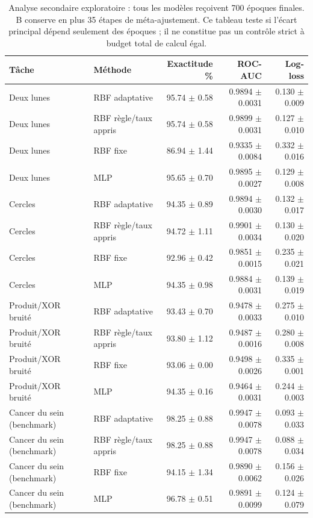 \documentclass[11pt,a4paper]{article}
\begin{document}
\begin{table}[htbp]
\centering
\small
\setlength{\tabcolsep}{4pt}
\renewcommand{\arraystretch}{1.08}
\begin{tabular}{llrrr}
\toprule
Tâche & Méthode & Exactitude \% & ROC-AUC & Log-loss \\
\midrule
Deux lunes & RBF adaptative & 95.74 $\pm$ 0.58 & 0.9894 $\pm$ 0.0031 & 0.130 $\pm$ 0.009 \\
Deux lunes & RBF règle/taux appris & 95.74 $\pm$ 0.58 & 0.9899 $\pm$ 0.0031 & 0.127 $\pm$ 0.010 \\
Deux lunes & RBF fixe & 86.94 $\pm$ 1.44 & 0.9335 $\pm$ 0.0084 & 0.332 $\pm$ 0.016 \\
Deux lunes & MLP & 95.65 $\pm$ 0.70 & 0.9895 $\pm$ 0.0027 & 0.129 $\pm$ 0.008 \\
Cercles & RBF adaptative & 94.35 $\pm$ 0.89 & 0.9894 $\pm$ 0.0030 & 0.132 $\pm$ 0.017 \\
Cercles & RBF règle/taux appris & 94.72 $\pm$ 1.11 & 0.9901 $\pm$ 0.0034 & 0.130 $\pm$ 0.020 \\
Cercles & RBF fixe & 92.96 $\pm$ 0.42 & 0.9851 $\pm$ 0.0015 & 0.235 $\pm$ 0.021 \\
Cercles & MLP & 94.35 $\pm$ 0.98 & 0.9884 $\pm$ 0.0031 & 0.139 $\pm$ 0.019 \\
Produit/XOR bruité & RBF adaptative & 93.43 $\pm$ 0.70 & 0.9478 $\pm$ 0.0033 & 0.275 $\pm$ 0.010 \\
Produit/XOR bruité & RBF règle/taux appris & 93.80 $\pm$ 1.12 & 0.9487 $\pm$ 0.0016 & 0.280 $\pm$ 0.008 \\
Produit/XOR bruité & RBF fixe & 93.06 $\pm$ 0.00 & 0.9498 $\pm$ 0.0026 & 0.335 $\pm$ 0.001 \\
Produit/XOR bruité & MLP & 94.35 $\pm$ 0.16 & 0.9464 $\pm$ 0.0031 & 0.244 $\pm$ 0.003 \\
Cancer du sein (benchmark) & RBF adaptative & 98.25 $\pm$ 0.88 & 0.9947 $\pm$ 0.0078 & 0.093 $\pm$ 0.033 \\
Cancer du sein (benchmark) & RBF règle/taux appris & 98.25 $\pm$ 0.88 & 0.9947 $\pm$ 0.0078 & 0.088 $\pm$ 0.034 \\
Cancer du sein (benchmark) & RBF fixe & 94.15 $\pm$ 1.34 & 0.9890 $\pm$ 0.0062 & 0.156 $\pm$ 0.026 \\
Cancer du sein (benchmark) & MLP & 96.78 $\pm$ 0.51 & 0.9891 $\pm$ 0.0099 & 0.124 $\pm$ 0.079 \\
\bottomrule
\end{tabular}
\caption{Analyse secondaire exploratoire : tous les modèles reçoivent 700 époques finales. B conserve en plus 35 étapes de méta-ajustement. Ce tableau teste si l'écart principal dépend seulement des époques ; il ne constitue pas un contrôle strict à budget total de calcul égal.}
\label{tab:equalepochs}
\end{table}
\end{document}

